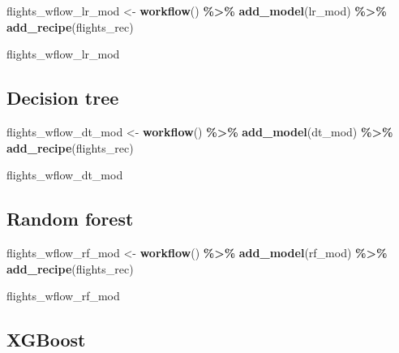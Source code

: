 \documentclass[
]{book}
\newenvironment{Shaded}{\begin{snugshade}}{\end{snugshade}}
\newcommand{\KeywordTok}[1]{\textcolor[rgb]{0.13,0.29,0.53}{\textbf{#1}}}
\newcommand{\NormalTok}[1]{#1}
\newcommand{\OperatorTok}[1]{\textcolor[rgb]{0.81,0.36,0.00}{\textbf{#1}}}
\newcommand{\StringTok}[1]{\textcolor[rgb]{0.31,0.60,0.02}{#1}}
\begin{document}
\begin{Shaded}
\begin{Highlighting}[]
\NormalTok{flights\_wflow\_lr\_mod \textless{}{-}}
\StringTok{  }\KeywordTok{workflow}\NormalTok{() }\OperatorTok{\%\textgreater{}\%}
\StringTok{  }\KeywordTok{add\_model}\NormalTok{(lr\_mod) }\OperatorTok{\%\textgreater{}\%}
\StringTok{  }\KeywordTok{add\_recipe}\NormalTok{(flights\_rec)}

\NormalTok{flights\_wflow\_lr\_mod}
\end{Highlighting}
\end{Shaded}

\hypertarget{decision-tree-1}{%
\subsection{Decision tree}\label{decision-tree-1}}

\begin{Shaded}
\begin{Highlighting}[]
\NormalTok{flights\_wflow\_dt\_mod \textless{}{-}}
\StringTok{  }\KeywordTok{workflow}\NormalTok{() }\OperatorTok{\%\textgreater{}\%}
\StringTok{  }\KeywordTok{add\_model}\NormalTok{(dt\_mod) }\OperatorTok{\%\textgreater{}\%}
\StringTok{  }\KeywordTok{add\_recipe}\NormalTok{(flights\_rec)}

\NormalTok{flights\_wflow\_dt\_mod}
\end{Highlighting}
\end{Shaded}

\hypertarget{random-forest-1}{%
\subsection{Random forest}\label{random-forest-1}}

\begin{Shaded}
\begin{Highlighting}[]
\NormalTok{flights\_wflow\_rf\_mod \textless{}{-}}
\StringTok{  }\KeywordTok{workflow}\NormalTok{() }\OperatorTok{\%\textgreater{}\%}
\StringTok{  }\KeywordTok{add\_model}\NormalTok{(rf\_mod) }\OperatorTok{\%\textgreater{}\%}
\StringTok{  }\KeywordTok{add\_recipe}\NormalTok{(flights\_rec)}

\NormalTok{flights\_wflow\_rf\_mod}
\end{Highlighting}
\end{Shaded}

\hypertarget{xgboost}{%
\subsection{XGBoost}\label{xgboost}}
\end{document}
